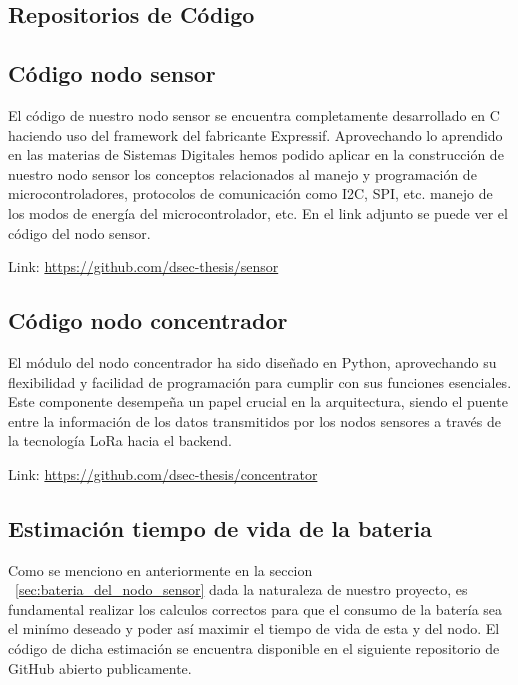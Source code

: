 \clearpage

\begin{appendixd}
    \section{Repositorios de Código}
        \subsection{Código nodo sensor}{\label{codigo_sensor}}
            El código de nuestro nodo sensor se encuentra completamente desarrollado en C haciendo uso del framework del fabricante
            Expressif. Aprovechando lo aprendido en las materias de Sistemas Digitales hemos podido aplicar en la construcción de nuestro
            nodo sensor los conceptos relacionados al manejo y programación de microcontroladores, protocolos de comunicación como I2C, SPI, etc.
            manejo de los modos de energía del microcontrolador, etc. En el link adjunto se puede ver el código del nodo sensor.


            Link: \url{https://github.com/dsec-thesis/sensor}

        \subsection{Código nodo concentrador}{\label{codigo_concentrador}}
            El módulo del nodo concentrador ha sido diseñado en Python, aprovechando su 
            flexibilidad y facilidad de programación para cumplir con sus funciones esenciales.
            Este componente desempeña un papel crucial en la arquitectura, siendo el puente entre 
            la información de los datos transmitidos por los nodos sensores a través de la tecnología
            LoRa hacia el backend.


            Link: \url{https://github.com/dsec-thesis/concentrator}

        \subsection{Estimación tiempo de vida de la bateria}{\label{codigo_estimacion_bateria}}
            Como se menciono en anteriormente en la seccion ~\ref{sec:bateria_del_nodo_sensor} dada la naturaleza de nuestro
            proyecto, es fundamental realizar los calculos correctos para que el consumo de la batería sea el minímo deseado 
            y poder así maximir el tiempo de vida de esta y del nodo. El código de dicha estimación se encuentra disponible
            en el siguiente repositorio de GitHub abierto publicamente.


\end{appendixd}
